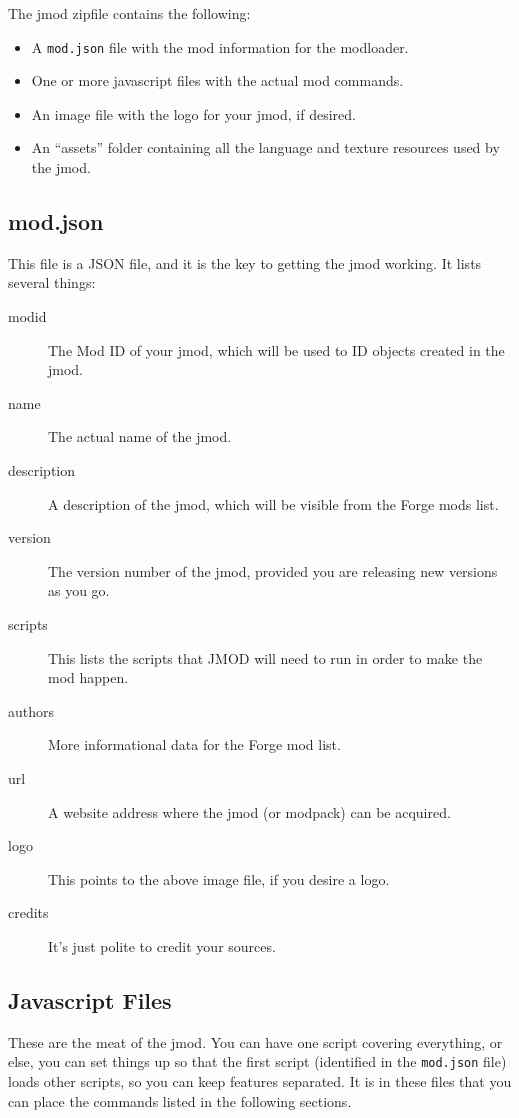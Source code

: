 \documentclass[letterpaper,titlepage,12pt]{article}
\begin{document}
The jmod zipfile contains the following:

\begin{itemize}
\item A \texttt{mod.json} file with the mod information for the modloader.
\item One or more javascript files with the actual mod commands.
\item An image file with the logo for your jmod, if desired.
\item An ``assets'' folder containing all the language and texture resources used by the jmod.
\end{itemize}

\subsection{mod.json}
This file is a JSON file, and it is the key to getting the jmod working.  It lists several things:

\begin{description}
\item[modid] The Mod ID of your jmod, which will be used to ID objects created in the jmod.
\item[name] The actual name of the jmod.
\item[description] A description of the jmod, which will be visible from the Forge mods list.
\item[version] The version number of the jmod, provided you are releasing new versions as you go.
\item[scripts] This lists the scripts that JMOD will need to run in order to make the mod happen.
\item[authors] More informational data for the Forge mod list.
\item[url] A website address where the jmod (or modpack) can be acquired.
\item[logo] This points to the above image file, if you desire a logo.
\item[credits] It's just polite to credit your sources.
\end{description}

\subsection{Javascript Files}

These are the meat of the jmod.  You can have one script covering everything, or else, you can set things up so that the first script (identified in the \texttt{mod.json} file) loads other scripts, so you can keep features separated.  It is in these files that you can place the commands listed in the following sections.
\end{document}

